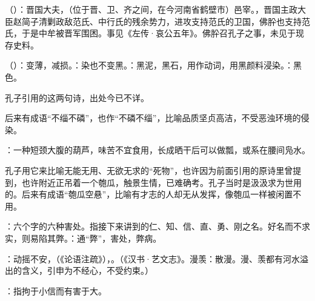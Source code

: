 {
\item {}（）：晋国大夫，（位于晋、卫、齐之间，在今河南省鹤壁市）邑宰。，晋国主政大臣赵简子清剿政敌范氏、中行氏的残余势力，进攻支持范氏的卫国，佛肸也支持范氏，于是中牟被晋军围困。事见《左传·哀公五年》。佛肸召孔子之事，未见于现存史料。

\item {}（）：变薄，减损。：染也不变黑。：黑泥，黑石，用作动词，用黑颜料浸染。：黑色。

孔子引用的这两句诗，出处今已不详。

后来有成语“不缁不磷”，也作“不磷不缁”，比喻品质坚贞高洁，不受恶浊环境的侵染。

\item {}：一种短颈大腹的葫芦，味苦不宜食用，长成晒干后可以做瓢，或系在腰间凫水。

孔子用它来比喻无能无用、无欲无求的“死物”，也许因为前面引用的原诗里曾提到，也许附近正吊着一个匏瓜，触景生情，已难确考。孔子当时是汲汲求为世用的。后来有成语“匏瓜空悬”，比喻有才志的人却无从发挥，像匏瓜一样被闲置不用。
}
{}


{
\item {}：六个字的六种害处。指接下来讲到的仁、知、信、直、勇、刚之名。好名而不求实，则易陷其弊。：通“弊”，害处，弊病。
\item {}：动摇不安，（《论语注疏》），。（《汉书·艺文志》。漫羡：散漫。漫、羡都有河水溢出的含义，引申为不经心，不受约束。）
\item {}：指拘于小信而有害于大。
}
{}  %


